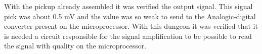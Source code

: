 With the pickup already assembled it was verified the output signal. This signal
pick was about 0.5 mV and ths value was so weak to send to the Analogic-digital
converter present on the microprocessor. With this dungeon it was verified that
it is needed a circuit responsible for the signal amplification to be possible to
read the signal with quality on the microprocessor.

